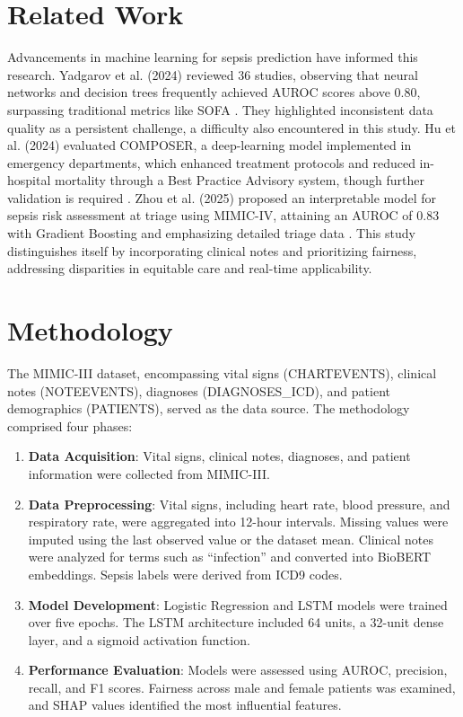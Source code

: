 \documentclass[journal]{IEEEtran}
\begin{document}
\section{Related Work}
Advancements in machine learning for sepsis prediction have informed this research. Yadgarov et al. (2024) reviewed 36 studies, observing that neural networks and decision trees frequently achieved AUROC scores above 0.80, surpassing traditional metrics like SOFA \cite{yadgarov2024early}. They highlighted inconsistent data quality as a persistent challenge, a difficulty also encountered in this study. Hu et al. (2024) evaluated COMPOSER, a deep-learning model implemented in emergency departments, which enhanced treatment protocols and reduced in-hospital mortality through a Best Practice Advisory system, though further validation is required \cite{hu2024impact}. Zhou et al. (2025) proposed an interpretable model for sepsis risk assessment at triage using MIMIC-IV, attaining an AUROC of 0.83 with Gradient Boosting and emphasizing detailed triage data \cite{zhou2025interpretable}. This study distinguishes itself by incorporating clinical notes and prioritizing fairness, addressing disparities in equitable care and real-time applicability.

\section{Methodology}
The MIMIC-III dataset, encompassing vital signs (CHARTEVENTS), clinical notes (NOTEEVENTS), diagnoses (DIAGNOSES\_ICD), and patient demographics (PATIENTS), served as the data source. The methodology comprised four phases:

\begin{enumerate}[itemsep=0pt,parsep=2pt]
    \item \textbf{Data Acquisition}: Vital signs, clinical notes, diagnoses, and patient information were collected from MIMIC-III.
    \item \textbf{Data Preprocessing}: Vital signs, including heart rate, blood pressure, and respiratory rate, were aggregated into 12-hour intervals. Missing values were imputed using the last observed value or the dataset mean. Clinical notes were analyzed for terms such as “infection” and converted into BioBERT embeddings. Sepsis labels were derived from ICD9 codes.
    \item \textbf{Model Development}: Logistic Regression and LSTM models were trained over five epochs. The LSTM architecture included 64 units, a 32-unit dense layer, and a sigmoid activation function.
    \item \textbf{Performance Evaluation}: Models were assessed using AUROC, precision, recall, and F1 scores. Fairness across male and female patients was examined, and SHAP values identified the most influential features.
\end{enumerate}
\end{document}
